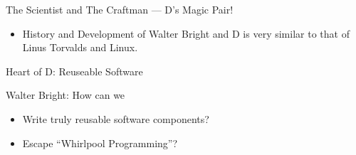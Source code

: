 \documentclass[xcolor=dvipsnames]{beamer}
\begin{document}
\begin{frame}[fragile]{The Scientist and The Craftman --- D's Magic Pair!}
  \begin{figure}
  \end{figure}
 \pause
  \begin{itemize}[<+->]
  \item History and Development of Walter Bright and D is very similar to that
    of Linus Torvalds and Linux.
  \end{itemize}
\end{frame}

\begin{frame}[fragile]{Heart of D: Reuseable Software}
  \begin{figure}
  \end{figure}
 Walter Bright: How can we
 \pause
  \begin{itemize}[<+->]
  \item Write truly reusable software components?
  \item Escape ``Whirlpool Programming''?
  \end{itemize}
\end{frame}
\end{document}
